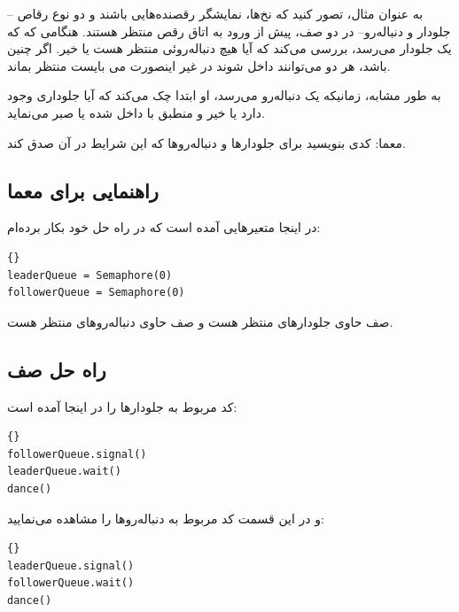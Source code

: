 \documentclass{book}
\newcommand{\clearemptydoublepage}{\newpage\cleardoublepage}
\begin{document}
    به عنوان مثال، تصور کنید که نخ‌ها، نمایشگر رقصنده‌هایی باشند و دو نوع رقاص --جلودار و  دنباله‌رو--
    در دو صف، پیش از ورود به اتاق رقص منتظر هستند. 
    هنگامی که که یک جلودار می‌رسد، بررسی می‌کند که آیا هیچ دنباله‌روئی منتظر هست یا خیر. 
    اگر چنین باشد، هر دو می‌توانند داخل شوند در غیر اینصورت می بایست منتظر بماند.

    به طور مشابه، زمانیکه یک دنباله‌رو می‌رسد، او ابتدا چک می‌کند که آیا جلوداری وجود دارد یا خیر و منطبق با داخل شده یا صبر می‌نماید. 

    معما:  کدی بنویسید برای جلو‌دارها و دنباله‌رو‌ها که این شرایط در آن صدق کند.


\clearemptydoublepage
\subsection {راهنمایی برای معما}

    در اینجا متعیرهایی آمده است که در راه حل خود بکار برده‌ام: 

\begin{latin}
\begin{latin}
\begin{lstlisting}[title={Queue hint}]{}
leaderQueue = Semaphore(0)
followerQueue = Semaphore(0)
\end{lstlisting}
\end{latin}
\end{latin}

     صف حاوی جلو‌دارهای منتظر هست و
 صف حاوی دنباله‌رو‌های منتظر هست.



\clearemptydoublepage
\subsection {راه حل صف}

    کد مربوط به جلو‌دارها را در اینجا آمده است:

\begin{latin}
\begin{latin}
\begin{lstlisting}[title={Queue solution (leaders)}]{}
followerQueue.signal()
leaderQueue.wait()
dance()
\end{lstlisting}
\end{latin}
\end{latin}

    و در این قسمت کد مربوط به دنباله‌روها را مشاهده می‌نمایید:

\begin{latin}
\begin{latin}
\begin{lstlisting}[title={Queue solution (followers)}]{}
leaderQueue.signal()
followerQueue.wait()
dance()
\end{lstlisting}
\end{latin}
\end{latin}
\end{document}
